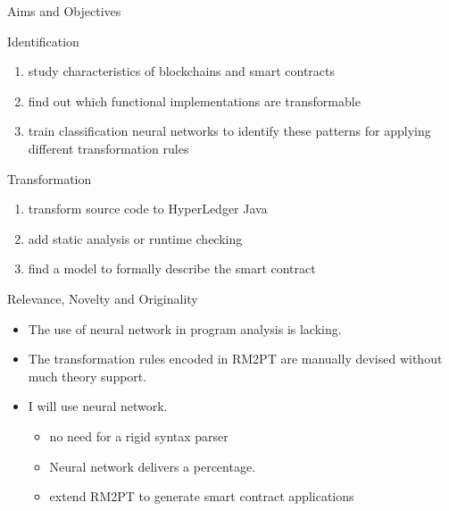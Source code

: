 \documentclass[xcolor=svgnames]{beamer}
\begin{document}
\begin{frame}{Aims and Objectives}

Identification\\
\begin{enumerate}
\item study characteristics of blockchains and smart contracts
\item find out which functional implementations are transformable
\item train classification neural networks to identify these patterns for applying different transformation rules
\end{enumerate}

Transformation\\
\begin{enumerate}
\item transform source code to HyperLedger Java
\item add static analysis or runtime checking
\item find a model to formally describe the smart contract
\end{enumerate}

\end{frame}

\begin{frame}{Relevance, Novelty and Originality}
\begin{itemize}
\item The use of neural network in program analysis is lacking.
\item The transformation rules encoded in RM2PT are manually devised without much theory support.
\item I will use neural network.
\begin{itemize}
\item no need for a rigid syntax parser
\item Neural network delivers a percentage.
\item extend RM2PT to generate smart contract applications
\end{itemize}
\end{itemize}


\end{frame}
\end{document}
